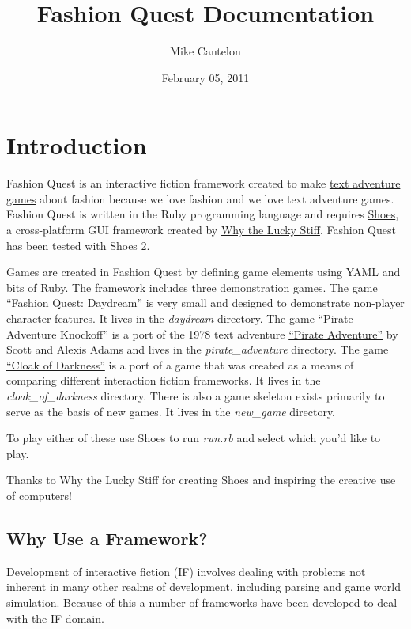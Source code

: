 \documentclass[letterpaper,10pt,english]{sphinxmanual}
\title{Fashion Quest Documentation}
\date{February 05, 2011}
\author{Mike Cantelon}
\begin{document}
\maketitle
\tableofcontents
{}\label{index::doc}



\chapter{Introduction}
\label{introduction:introduction}\label{introduction::doc}\label{introduction:fashion-quest}
Fashion Quest is an interactive fiction framework created to make \href{http://en.wikipedia.org/wiki/Interactive\_fiction}{text adventure games} about fashion because we love fashion and we love text adventure games. Fashion Quest is written in the Ruby programming language and requires \href{http://shoes.heroku.com/}{Shoes}, a cross-platform GUI framework created by \href{http://en.wikipedia.org/wiki/Why\_the\_lucky\_stiff/}{Why the Lucky Stiff}. Fashion Quest has been tested with Shoes 2.

Games are created in Fashion Quest by defining game elements using YAML and bits of Ruby. The framework includes three demonstration games. The game ``Fashion Quest: Daydream'' is very small and designed to demonstrate non-player character features. It lives in the \emph{daydream} directory. The game ``Pirate Adventure Knockoff'' is a port of the 1978 text adventure \href{http://en.wikipedia.org/wiki/Pirate\_Adventure}{``Pirate Adventure''} by Scott and Alexis Adams and lives in the \emph{pirate\_adventure} directory. The game \href{http://www.firthworks.com/roger/cloak/}{``Cloak of Darkness''} is a port of a game that was created as a means of comparing different interaction fiction frameworks. It lives in the \emph{cloak\_of\_darkness} directory. There is also a game skeleton exists primarily to serve as the basis of new games. It lives in the \emph{new\_game} directory.

To play either of these use Shoes to run \emph{run.rb} and select which you’d like to play.

Thanks to Why the Lucky Stiff for creating Shoes and inspiring the creative use of computers!


\section{Why Use a Framework?}
\label{introduction:why-use-a-framework}\label{introduction:cloak-of-darkness}
Development of interactive fiction (IF) involves dealing with problems not inherent in many other realms of development, including parsing and game world simulation. Because of this a number of frameworks have been developed to deal with the IF domain.
\end{document}
